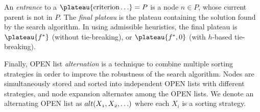 An \emph{entrance} to a $\plateau{\text{criterion}\ldots}=P$ is
a node $n \in P$, whose current parent is not in
$P$. The \emph{final plateau} is the plateau
containing the solution found by the search algorithm.  In \astar using
admissible heuristics, the final plateau is $\plateau{f^*}$ (without
tie-breaking), or $\plateau{f^*,0}$ (with $h$-based tie-breaking).

Finally, OPEN list \emph{alternation}  \cite{RogerH10} is a technique to combine multiple
sorting strategies in order to improve the robustness of the search algorithm.
Nodes are simultaneously stored and sorted into
independent OPEN lists with different strategies, and
node expansion alternates among the OPEN lists.
We denote an alternating OPEN list as $\mit{alt}(X_1,X_2,\ldots)$ where
each $X_i$ is a sorting strategy.
